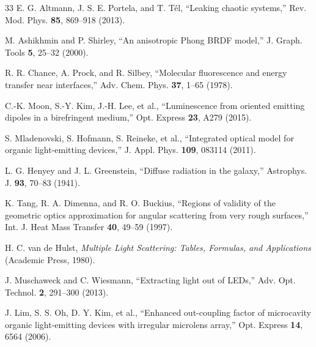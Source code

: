 \documentclass{optica-article}
\begin{document}
\begin{thebibliography}{33}
 E. G. Altmann, J. S. E. Portela, and T. Tél, ``Leaking chaotic systems,'' Rev. Mod. Phys. \textbf{85}, 869–918 (2013).


 M. Ashikhmin and P. Shirley, ``An anisotropic Phong BRDF model,'' J. Graph. Tools \textbf{5}, 25–32 (2000).


 R. R. Chance, A. Prock, and R. Silbey, ``Molecular fluorescence and energy transfer near interfaces,'' Adv. Chem. Phys. \textbf{37}, 1–65 (1978).


 C.-K. Moon, S.-Y. Kim, J.-H. Lee, et al., ``Luminescence from oriented emitting dipoles in a birefringent medium,'' Opt. Express \textbf{23}, A279 (2015).


 S. Mladenovski, S. Hofmann, S. Reineke, et al., ``Integrated optical model for organic light-emitting devices,'' J. Appl. Phys. \textbf{109}, 083114 (2011).


 L. G. Henyey and J. L. Greenstein, ``Diffuse radiation in the galaxy,'' Astrophys. J. \textbf{93}, 70–83 (1941).


 K. Tang, R. A. Dimenna, and R. O. Buckius, ``Regions of validity of the geometric optics approximation for angular scattering from very rough surfaces,'' Int. J. Heat Mass Transfer \textbf{40}, 49–59 (1997).


 H. C. van de Hulst, \emph{Multiple Light Scattering: Tables, Formulas, and Applications} (Academic Press, 1980).


 J. Muschaweck and C. Wiesmann, ``Extracting light out of LEDs,'' Adv. Opt. Technol. \textbf{2}, 291–300 (2013).


 J. Lim, S. S. Oh, D. Y. Kim, et al., ``Enhanced out-coupling factor of microcavity organic light-emitting devices with irregular microlens array,'' Opt. Express \textbf{14}, 6564 (2006).


\end{thebibliography}
\end{document}
